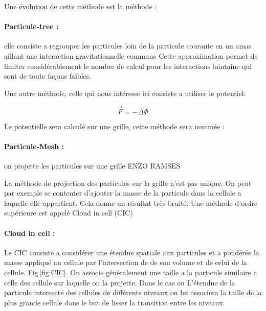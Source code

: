 Une évolution de cette méthode est la méthode :

\paragraph{Particule-tree : } elle  consiste a regrouper les particules loin de la particule courante en un amas aillant une interaction gravitationnelle commune
Cette approximation permet de limiter considérablement le nombre de calcul pour les interactions lointaine qui sont de toute façons faibles.


Une autre méthode, celle qui nous intéresse ici consiste a utiliser le potentiel:


\begin{equation}
\vec{F}=-\Delta \Phi
\end{equation}

Le potentielle sera calculé sur une grille, cette méthode sera nommée :
\paragraph{Particule-Mesh : } on projette les particules sur une grille
ENZO %
RAMSES

La méthode de projection des particules sur la grille n'est pas unique.
On peut par exemple se contenter d'ajouter la masse de la particule dans la cellule a laquelle elle appartient.
Cela donne un résultat très bruité.
Une méthode d'ordre supérieure est appelé Cloud in cell (CIC)

\paragraph{Cloud in cell : } Le CIC consiste a considérer une étendue spatiale aux particules et a pondérée la masse appliqué au cellule par l'intersection de de son volume et de celui de la cellule.
Fig\,\ref{fig:CIC}.
On associe généralement une taille a la particule similaire a celle des cellule sur laquelle on la projette.
Dans le cas ou L’étendue de la particule intersecte des cellules de différents niveaux on lui associera la taille de la plus grande cellule dans le but de lisser la transition entre les niveaux.


